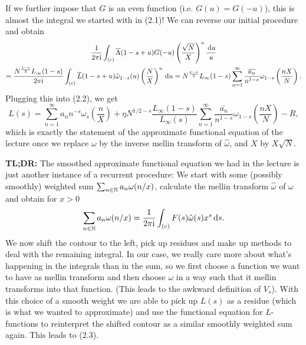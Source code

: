 \documentclass[a4paper,11pt]{article}
\begin{document}
If we further impose that $G$ is an even function (i.e. $G(u) = G(-u)$), this is
almost the integral we started with in (2.1)! We can reverse our initial procedure
and obtain
\begin{multline*}
    \frac{1}{2 \pi \mathrm i} \int_{(c)} \overline \Lambda(1-s+u) G(-u) \left( \frac {\sqrt N}X \right)^u \frac {\mathrm{\,d} u} u \\ = \frac{N^{\frac{1-s}2}L_\infty(1-s)}{2 \pi \mathrm i} \int_{(c)}
    \overline L(1-s+u) \hat \omega_{1-s}(u) \left( \frac NX \right)^u \mathrm{\,d} u
    = N^{\frac{1-s}2} L_\infty(1-s) \sum_{n=1}^\infty \frac{\overline{a_n}}{n^{1-s}}
    \omega_{1-s}\left(\frac{nX}N\right).
\end{multline*}
Plugging this into (2.2), we get 
\begin{equation}
    L(s) = \sum_{n=1}^\infty a_n n^{-s} \omega_s\left(\frac nX\right) + \eta N^{1/2 - s} \frac{L_\infty(1-s)}{L_\infty(s)} \sum_{n=1}^\infty \frac{\bar{a_n}}{n^{1-s}}
    \omega_{1-s}\left(\frac{nX}N\right) - R,
\end{equation}
which is exactly the statement of the approximate functional equation of the lecture
once we replace $\omega$ by the inverse mellin transform of $\hat \omega$, 
and $X$ by $X\sqrt N$. 

\textbf{TL;DR:} The smoothed approximate functional equation we had in the lecture
is just another instance of a recurrent procedure: 
We start with some (possibly smoothly) weighted sum $\sum_{n \in \mathbb{N}} a_n
\omega(n/x)$, calculate the mellin transform $\hat \omega$ of $\omega$ and obtain
for $x > 0$ 
$$ \sum_{n \in \mathbb{N}} a_n \omega(n/x) =\frac{1}{2 \pi \mathrm i} \int_{(c)} F(s) \hat \omega(s) x^s
\mathrm{\,d} s. $$
We now shift the contour to the left, pick up residues and make up methods to
deal with the remaining integral. In our case, we really care more about what's 
happening in the integrals than in the sum, so we first choose a function we want to
have as mellin transform and then choose $\omega$ in a way such that it mellin
transforms into that function. (This leads to the awkward definition of $V_s$).
With this choice of a smooth weight we are able to pick up $L(s)$ as 
a residue (which is what we wanted to approximate) and use the 
functional equation for $L$-functions to reinterpret the shifted contour as 
a similar smoothly weighted sum again. This leads to (2.3).



\end{document}
